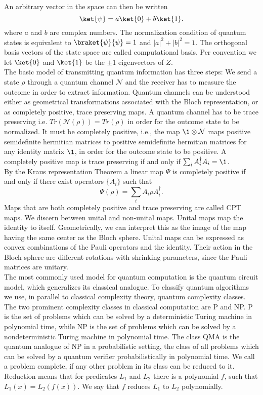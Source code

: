 An arbitrary vector in the space can then be written \[
\ket{\psi} = a\ket{0}+b\ket{1}
.\]
where $a$ and $b$ are complex numbers.
The normalization condition of quantum states is equivalent to $\braket{\psi}{\psi}=1$ and $ \left| a \right|^2+\left| b \right|^2=1$.
The orthogonal basis vectors of the state space are called computational basis.
Per convention we let $\ket{0}$ and $\ket{1}$ be the $\pm 1$ eigenvectors of $Z$.\\
The basic model of transmitting quantum information has three steps:
We send a state $\rho$ through a quantum channel $\mathcal{N}$ and the receiver has to measure the outcome in order to extract information.
Quantum channels can be understood either as geometrical transformations associated with the Bloch representation, or as completely positive, trace preserving maps.
A quantum channel has to be trace preserving i.e. $Tr(\mathcal{N}(\rho))=Tr(\rho)$ in order for the outcome state to be normalized.
It must be completely positive, i.e., the map $\1\otimes\mathcal{N}$ maps positive semidefinite hermitian matrices to positive semidefinite hermitian matrices for any identity matrix $\1$, in order for the outcome state to be positive.
A completely positive map is trace preserving if and only if $\sum_{i} A_i^{\dagger}A_i = \1$.\\
By the Kraus representation Theorem \cite{choi75} a linear map $\Psi$ is completely positive if and only if there exist operators $ \{A_i\} $ such that \[
\Psi\left(\rho\right)=\sum_{i}A_i\rho A_i^{\dagger}
.\]
Maps that are both completely positive and trace preserving are called CPT maps.
We discern between unital and non-unital maps.
Unital maps map the identity to itself.
Geometrically, we can interpret this as the image of the map having the same center as the Bloch sphere.
Unital maps can be expressed as convex combinations of the Pauli operators and the identity.
Their action in the Bloch sphere are different rotations with shrinking parameters, since the Pauli matrices are unitary.\cite{imre12}\\
The most commonly used model for quantum computation is the quantum circuit model, which generalizes its classical analogue.
To classify quantum algorithms we use, in parallel to classical complexity theory, quantum complexity classes.
The two prominent complexity classes in classical computation are P and NP.
P is the set of problems which can be solved by a deterministic Turing machine in polynomial time, while NP is the set of problems which can be solved by a nondeterministic Turing machine in polynomial time.
The class QMA is the quantum analogue of NP in a probabilistic setting, the class of all problems which can be solved by a quantum verifier probabilistically in polynomial time.\cite{kempe06}
We call a problem complete, if any other problem in its class can be reduced to it.
Reduction means that for predicates $L_1$ and $L_2$ there is a polynomial $f$, such that $L_1(x)=L_2(f(x))$.
We say that $f$ reduces  $L_1$ to $L_2$ polynomially.\\

